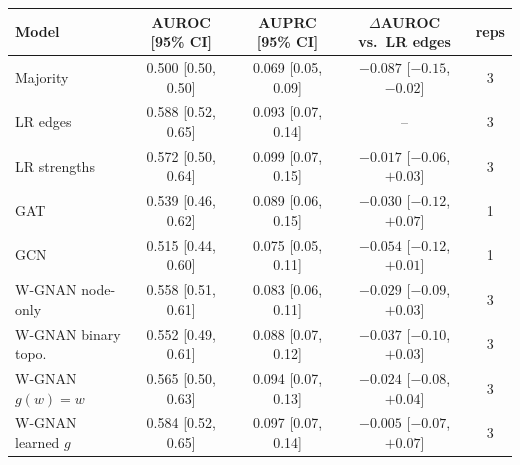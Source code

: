 \begin{tabular}{lcccc}
\toprule
Model & AUROC [95\% CI] & AUPRC [95\% CI] & $\Delta$AUROC vs.\ LR edges & reps \\
\midrule
Majority & 0.500 [0.50, 0.50] & 0.069 [0.05, 0.09] & $-0.087$ [$-0.15$, $-0.02$] & 3 \\
LR edges & 0.588 [0.52, 0.65] & 0.093 [0.07, 0.14] & -- & 3 \\
LR strengths & 0.572 [0.50, 0.64] & 0.099 [0.07, 0.15] & $-0.017$ [$-0.06$, $+0.03$] & 3 \\
GAT & 0.539 [0.46, 0.62] & 0.089 [0.06, 0.15] & $-0.030$ [$-0.12$, $+0.07$] & 1 \\
GCN & 0.515 [0.44, 0.60] & 0.075 [0.05, 0.11] & $-0.054$ [$-0.12$, $+0.01$] & 1 \\
W-GNAN node-only & 0.558 [0.51, 0.61] & 0.083 [0.06, 0.11] & $-0.029$ [$-0.09$, $+0.03$] & 3 \\
W-GNAN binary topo. & 0.552 [0.49, 0.61] & 0.088 [0.07, 0.12] & $-0.037$ [$-0.10$, $+0.03$] & 3 \\
W-GNAN $g(w)=w$ & 0.565 [0.50, 0.63] & 0.094 [0.07, 0.13] & $-0.024$ [$-0.08$, $+0.04$] & 3 \\
W-GNAN learned $g$ & 0.584 [0.52, 0.65] & 0.097 [0.07, 0.14] & $-0.005$ [$-0.07$, $+0.07$] & 3 \\
\bottomrule
\end{tabular}
